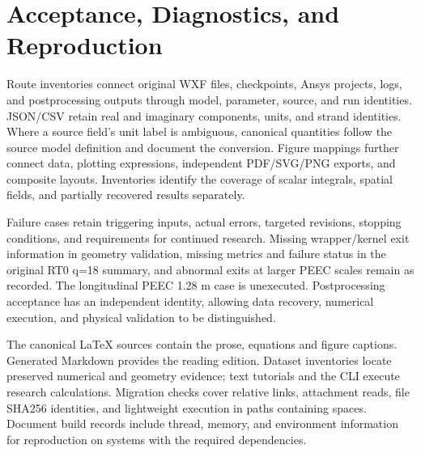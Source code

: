 \section{Acceptance, Diagnostics, and Reproduction}
\label{chapter:C}

\hypertarget{C.report_repro.p1}{}
Route inventories connect original WXF files, checkpoints, Ansys projects, logs, and postprocessing outputs through model, parameter, source, and run identities. JSON/CSV retain real and imaginary components, units, and strand identities. Where a source field's unit label is ambiguous, canonical quantities follow the source model definition and document the conversion. Figure mappings further connect data, plotting expressions, independent PDF/SVG/PNG exports, and composite layouts. Inventories identify the coverage of scalar integrals, spatial fields, and partially recovered results separately.

\hypertarget{C.report_repro.p2}{}
Failure cases retain triggering inputs, actual errors, targeted revisions, stopping conditions, and requirements for continued research. Missing wrapper/kernel exit information in geometry validation, missing metrics and failure status in the original RT0 q=18 summary, and abnormal exits at larger PEEC scales remain as recorded. The longitudinal PEEC 1.28 m case is unexecuted. Postprocessing acceptance has an independent identity, allowing data recovery, numerical execution, and physical validation to be distinguished.

\hypertarget{C.report_repro.p3}{}
The canonical LaTeX sources contain the prose, equations and figure captions. Generated Markdown provides the reading edition. Dataset inventories locate preserved numerical and geometry evidence; text tutorials and the CLI execute research calculations. Migration checks cover relative links, attachment reads, file SHA256 identities, and lightweight execution in paths containing spaces. Document build records include thread, memory, and environment information for reproduction on systems with the required dependencies.

